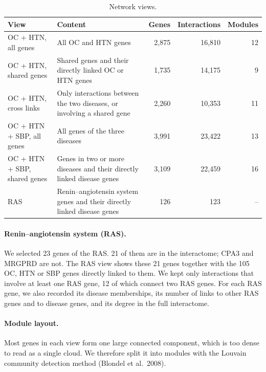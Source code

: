 \documentclass[11pt]{article}
\begin{document}
\begin{table}[h]
  \centering
  \small
  \begin{tabularx}{\textwidth}{lYrrr}
    \toprule
    View                         & Content                                                                 & Genes & Interactions & Modules \\
    \midrule
    OC + HTN, all genes          & All OC and HTN genes                                                    & 2,875 & 16,810       & 12      \\
    OC + HTN, shared genes       & Shared genes and their directly linked OC or HTN genes                  & 1,735 & 14,175       & 9       \\
    OC + HTN, cross links        & Only interactions between the two diseases, or involving a shared gene  & 2,260 & 10,353       & 11      \\
    OC + HTN + SBP, all genes    & All genes of the three diseases                                         & 3,991 & 23,422       & 13      \\
    OC + HTN + SBP, shared genes & Genes in two or more diseases and their directly linked disease genes   & 3,109 & 22,459       & 16      \\
    RAS                          & Renin--angiotensin system genes and their directly linked disease genes & 126   & 123          & --      \\
    \bottomrule
  \end{tabularx}
  \caption{Network views.}
\end{table}

\paragraph{Renin--angiotensin system (RAS).} We selected 23 genes of the RAS. 21 of them are in the interactome; CPA3 and MRGPRD are not. The RAS view shows these 21 genes together with the 105 OC, HTN or SBP genes directly linked to them. We kept only interactions that involve at least one RAS gene, 12 of which connect two RAS genes. For each RAS gene, we also recorded its disease memberships, its number of links to other RAS genes and to disease genes, and its degree in the full interactome.

\paragraph{Module layout.} Most genes in each view form one large connected component, which is too dense to read as a single cloud. We therefore split it into modules with the Louvain community detection method (Blondel et al.\ 2008).
\end{document}
